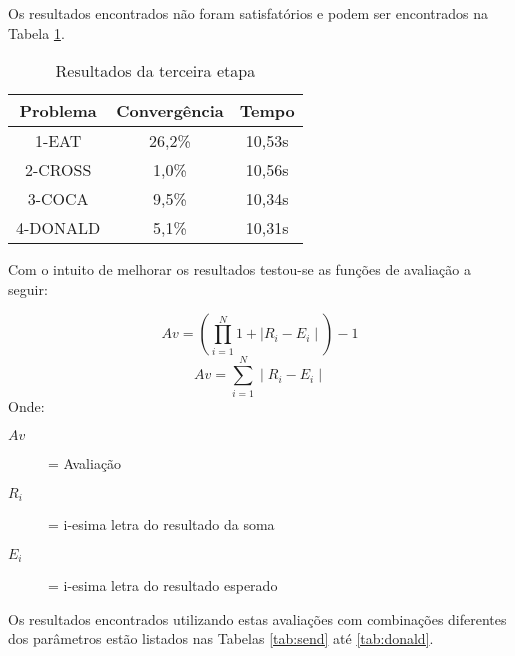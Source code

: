 \documentclass[a4paper, 12pt]{article}
\begin{document}
Os resultados encontrados não foram satisfatórios e podem ser encontrados na
Tabela \ref{tab:etapa3}.

  \begin{table}[h]
    \centering
    \begin{tabular}{|c|c|c|}
      \hline
      Problema & Convergência & Tempo \\
      \hline
      1-EAT & 26,2\% & 10,53s \\
      \hline
      2-CROSS & 1,0\% & 10,56s \\
      \hline
      3-COCA & 9,5\% & 10,34s \\
      \hline
      4-DONALD & 5,1\% & 10,31s \\
      \hline
    \end{tabular}
    \caption{Resultados da terceira etapa}
    \label{tab:etapa3}
  \end{table}

Com o intuito de melhorar os resultados testou-se as funções de avaliação a seguir:

  \begin{equation}
    Av = (\prod_{i=1}^{N} 1+\mid R_i - E_i\mid) -1
    \label{eq:avprod}
  \end{equation}
  \begin{equation}
    Av = \sum_{i=1}^{N} \mid R_i - E_i\mid
    \label{eq:avdifind}
  \end{equation}
Onde:
  \begin{description}
    \item[\(Av\)] = Avaliação
    \item[\(R_i\)] = i-esima letra do resultado da soma
    \item[\(E_i\)] = i-esima letra do resultado esperado
  \end{description}

Os resultados encontrados utilizando estas avaliações com combinações diferentes
dos parâmetros estão listados nas Tabelas \ref{tab:send} até \ref{tab:donald}.
\end{document}

